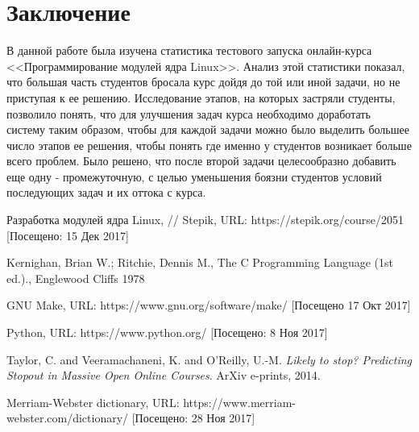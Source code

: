 \documentclass[a4paper,12pt]{article}
\begin{document}
\section{Заключение}
В данной работе была изучена статистика тестового запуска онлайн-курса <<Программирование модулей ядра Linux>>. Анализ этой статистики показал, что большая часть студентов бросала курс дойдя до той или иной задачи, но не приступая к ее решению. Исследование этапов, на которых застряли студенты, позволило понять, что для улучшения задач курса необходимо доработать систему таким образом, чтобы для каждой задачи можно было выделить большее число этапов ее решения, чтобы понять где именно у студентов возникает больше всего проблем. Было решено, что после второй задачи целесообразно добавить еще одну - промежуточную, с целью уменьшения боязни студентов условий последующих задач и их оттока с курса.

\begin{thebibliography}{9}
	Разработка модулей ядра Linux, // Stepik, URL:
	https://stepik.org/course/2051
	[Посещено: 15 Дек 2017]
	
	Kernighan, Brian W.; Ritchie, Dennis M.,
	The C Programming Language (1st ed.).,
	Englewood Cliffs 1978
	
	GNU Make,
	URL: https://www.gnu.org/software/make/
	[Посещено 17 Окт 2017]
	
	Python,
	URL: https://www.python.org/
	[Посещено: 8 Ноя 2017]
	
	{Taylor}, C. and {Veeramachaneni}, K. and {O'Reilly}, U.-M.
	\textit{Likely to stop? Predicting Stopout in Massive Open Online Courses}.
	ArXiv e-prints, 2014.
	
	Merriam-Webster dictionary,
	URL: https://www.merriam-webster.com/dictionary/
	[Посещено: 28 Ноя 2017]	
\end{thebibliography}
\end{document}
